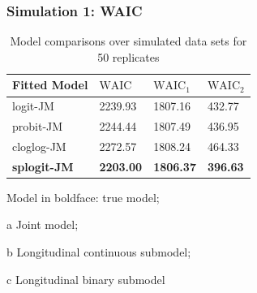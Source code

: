 \documentclass[fleqn]{beamer}
\begin{document}
\begin{frame}
\frametitle{Simulation 1: WAIC}
\footnotesize
\begin{table}[H]
\caption{\scriptsize Model comparisons over simulated data sets for 50 replicates}
 \begin{threeparttable}
  \begin{tabular}{llll}
  \toprule
 Fitted Model \hspace*{5mm} & $\mbox{WAIC}$ \tnote{a} \hspace*{4mm} & $\mbox{WAIC}_1$ \tnote{b}  \hspace*{4mm}  & $\mbox{WAIC}_2$ \tnote{c}  \hspace*{4mm}\\
 \midrule
   logit-JM & 2239.93 & 1807.16 & 432.77 \\
  
   probit-JM & 2244.44 & 1807.49 & 436.95 \\
  
   cloglog-JM & 2272.57  & 1808.24 & 464.33 \\
   
   \bf splogit-JM & \bf 2203.00 & \bf 1806.37 & \bf 396.63 \\
    \bottomrule
  \end{tabular}
  \begin{tablenotes}[para]
    \tiny
    Model in boldface: true model; \item[a] Joint model; \item[b] Longitudinal continuous submodel; \item[c] Longitudinal binary submodel
    \end{tablenotes}
    \end{threeparttable}
\end{table}
\end{frame}
\end{document}
